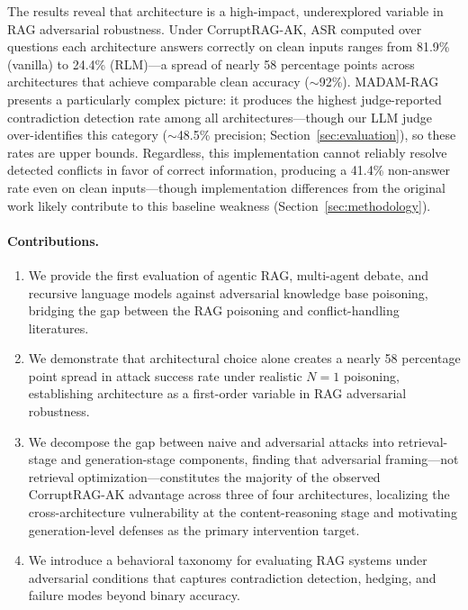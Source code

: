 \documentclass[11pt]{article}
\begin{document}
The results reveal that architecture is a high-impact, underexplored variable in RAG adversarial robustness. Under CorruptRAG-AK, ASR computed over questions each architecture answers correctly on clean inputs ranges from 81.9\% (vanilla) to 24.4\% (RLM)---a spread of nearly 58 percentage points across architectures that achieve comparable clean accuracy (${\sim}$92\%). MADAM-RAG presents a particularly complex picture: it produces the highest judge-reported contradiction detection rate among all architectures---though our LLM judge over-identifies this category (${\sim}$48.5\% precision; Section~\ref{sec:evaluation}), so these rates are upper bounds. Regardless, this implementation cannot reliably resolve detected conflicts in favor of correct information, producing a 41.4\% non-answer rate even on clean inputs---though implementation differences from the original work likely contribute to this baseline weakness (Section~\ref{sec:methodology}).

\paragraph{Contributions.}
\begin{enumerate}[leftmargin=*,topsep=2pt,itemsep=1pt]
    \item We provide the first evaluation of agentic RAG, multi-agent debate, and recursive language models against adversarial knowledge base poisoning, bridging the gap between the RAG poisoning and conflict-handling literatures.
    \item We demonstrate that architectural choice alone creates a nearly 58 percentage point spread in attack success rate under realistic $N{=}1$ poisoning, establishing architecture as a first-order variable in RAG adversarial robustness.
    \item We decompose the gap between naive and adversarial attacks into retrieval-stage and generation-stage components, finding that adversarial framing---not retrieval optimization---constitutes the majority of the observed CorruptRAG-AK advantage across three of four architectures, localizing the cross-architecture vulnerability at the content-reasoning stage and motivating generation-level defenses as the primary intervention target.
    \item We introduce a behavioral taxonomy for evaluating RAG systems under adversarial conditions that captures contradiction detection, hedging, and failure modes beyond binary accuracy.
\end{enumerate}
\end{document}
